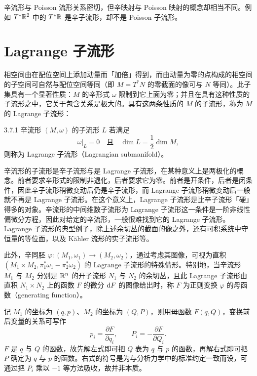 辛流形与 Poisson 流形关系密切，但辛映射与 Poisson 映射的概念却相当不同。例如 $T^*\mathbb{R}^2$ 中的 $T^*\mathbb{R}$ 是辛子流形，却不是 Poisson 子流形。

\section{Lagrange 子流形}

相空间由在配位空间上添加动量而「加倍」得到，而由动量为零的点构成的相空间的子空间可自然与配位空间等同（即 $M=T^*N$ 的零截面的像可与 $N$ 等同）。此子集具有一个显著性质：$M$ 的辛形式 $\omega$ 限制到它上面为零；并且在具有这种性质的子流形之中，它关于包含关系是极大的。具有这两条性质的 $M$ 的子流形，称为 $M$ 的 Lagrange 子流形：

\begin{definition}{3.7.1}
  辛流形 $(M,\omega)$ 的子流形 $L$ 若满足
  \begin{equation}
    \omega|_L=0\quad\text{且}\quad \dim L=\frac{1}{2}\dim M,
    \tag{3.7.1}
  \end{equation}
  则称为 Lagrange 子流形（Lagrangian submanifold）。
\end{definition}

辛流形的子流形是辛子流形与是 Lagrange 子流形，在某种意义上是两极化的概念。前者要求辛形式的限制非退化，后者要求它为零。前者是开条件，后者是闭条件，因此辛子流形稍微变动后仍是辛子流形，而 Lagrange 子流形稍微变动后一般就不再是 Lagrange 子流形。在这个意义上，Lagrange 子流形是比辛子流形「硬」得多的对象。辛流形的中间维数子流形为 Lagrange 子流形这一条件是一阶非线性偏微分方程，因此对给定的辛流形，一般很难找到它的 Lagrange 子流形。Lagrange 子流形的典型例子，除上述余切丛的截面的像之外，还有可积系统中守恒量的等位面，以及 Kähler 流形的实子流形等。

此外，辛同胚 $\varphi\colon(M_1,\omega_1)\to(M_2,\omega_2)$，通过考虑其图像，可视为直积 $(M_1\times M_2,\pi_1^*\omega_1-\pi_2^*\omega_2)$ 的 Lagrange 子流形的特殊情形。特别地，当辛流形 $M_1$ 与 $M_2$ 分别是 $\mathbb{R}^n$ 的开子流形 $N_1$ 与 $N_2$ 的余切丛，且此 Lagrange 子流形由直积 $N_1\times N_2$ 上的函数 $F$ 的微分 $\mathrm{d} F$ 的图像给出时，称 $F$ 为正则变换 $\varphi$ 的母函数（generating function）。

记 $M_1$ 的坐标为 $(q,p)$、$M_2$ 的坐标为 $(Q,P)$，则用母函数 $F(q,Q)$，变换前后变量的关系可写作
\begin{equation}
  p_i=\frac{\partial F}{\partial q_i},\qquad
  P_i=-\frac{\partial F}{\partial Q_i}.
  \tag{3.7.2}
\end{equation}
$F$ 是 $q$ 与 $Q$ 的函数，故先解左式即可把 $Q$ 表为 $q$ 与
$p$ 的函数，再解右式即可把 $P$ 确定为 $q$ 与 $p$ 的函数。右式的符号是为与分析力学中的标准约定一致而设，可通过把 $P_i$ 乘以 $-1$ 等方法吸收，故并非本质。

